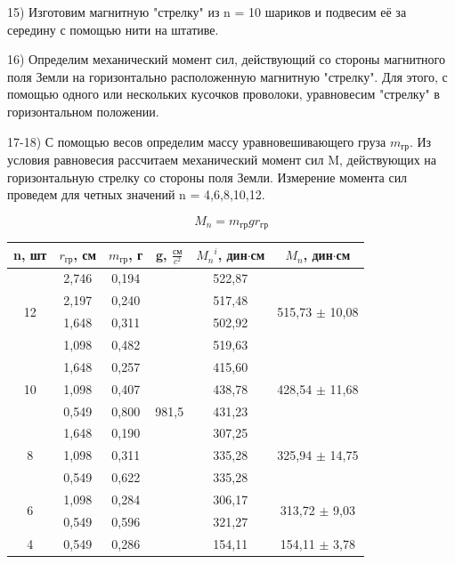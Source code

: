 \documentclass[a4paper,12pt]{article}
\begin{document}
15) Изготовим магнитную "стрелку" из n = 10 шариков и подвесим её за середину с помощью нити на штативе.

16) Определим механический момент сил, действующий со стороны магнитного поля Земли на горизонтально расположенную магнитную "стрелку". Для этого, с помощью одного или нескольких кусочков проволоки, уравновесим "стрелку" в горизонтальном положении. 

17-18) С помощью весов определим массу уравновешивающего груза $m_{гр}$. Из условия равновесия рассчитаем механический момент сил M, действующих на горизонтальную стрелку со стороны поля Земли. Измерение момента сил проведем для четных значений n = 4,6,8,10,12.

$$ M_n = m_{гр}gr_{гр}  $$	

\begin{center}
\begin{tabular}{|c|c|c|c|c|c|}
	\hline
	n, шт & $r_{гр}$, см & $m_{гр}$, г & g, $\frac{\text{см}}{c^2}$ & ${M_n}^i$, дин$\cdot$см & $M_n$, дин$\cdot$см\\
	\hline
	\multirow{4}{*}{12} & 2,746 & 0,194 & \multirow{13}{*}{981,5} & 522,87 & \multirow{4}{*}{515,73 $\pm$ 10,08}\\
	\cline{2-3}\cline{5-5} 		& 2,197 & 0,240 &  & 517,48 & \\
	\cline{2-3}\cline{5-5} 		& 1,648 & 0,311 &  & 502,92 & \\
	\cline{2-3}\cline{5-5} 		& 1,098 & 0,482 &  & 519,63 & \\
	\cline{1-3}\cline{5-6}
	\multirow{3}{*}{10} & 1,648 & 0,257 &  & 415,60 & \multirow{3}{*}{428,54 $\pm$ 11,68}\\
	\cline{2-3}\cline{5-5}      & 1,098 & 0,407 &  & 438,78 & \\
    \cline{2-3}\cline{5-5}      & 0,549 & 0,800 &  & 431,23 & \\
    \cline{1-3}\cline{5-6}
    \multirow{3}{*}{8} & 1,648 & 0,190 &  & 307,25 & \multirow{3}{*}{325,94 $\pm$ 14,75}\\
    \cline{2-3}\cline{5-5}      & 1,098 & 0,311 &  & 335,28 & \\
    \cline{2-3}\cline{5-5}      & 0,549 & 0,622 &  & 335,28 & \\
   	\cline{1-3}\cline{5-6}
   	\multirow{2}{*}{6} & 1,098 & 0,284 &  & 306,17 & \multirow{2}{*}{313,72 $\pm$ 9,03}\\
    \cline{2-3}\cline{5-5}      & 0,549 & 0,596 &  & 321,27 & \\
	\cline{1-3}\cline{5-6}
	4 & 0,549 & 0,286 & & 154,11 & 154,11 $\pm$ 3,78 \\
	\hline
\end{tabular}
\end{center}
\end{document}

